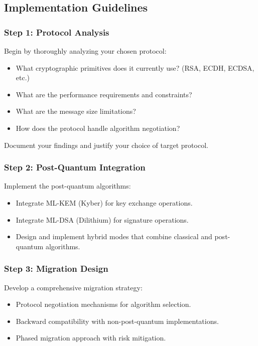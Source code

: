 \documentclass[10pt,a4paper,american]{article}
\begin{document}
\subsection*{Implementation Guidelines}

\subsubsection*{Step 1: Protocol Analysis}
Begin by thoroughly analyzing your chosen protocol:
\begin{itemize}
	\item What cryptographic primitives does it currently use? (RSA, ECDH, ECDSA, etc.)
	\item What are the performance requirements and constraints?
	\item What are the message size limitations?
	\item How does the protocol handle algorithm negotiation?
\end{itemize}

Document your findings and justify your choice of target protocol.

\subsubsection*{Step 2: Post-Quantum Integration}
Implement the post-quantum algorithms:
\begin{itemize}
	\item Integrate ML-KEM (Kyber) for key exchange operations.
	\item Integrate ML-DSA (Dilithium) for signature operations.
	\item Design and implement hybrid modes that combine classical and post-quantum algorithms.
\end{itemize}

\subsubsection*{Step 3: Migration Design}
Develop a comprehensive migration strategy:
\begin{itemize}
	\item Protocol negotiation mechanisms for algorithm selection.
	\item Backward compatibility with non-post-quantum implementations.
	\item Phased migration approach with risk mitigation.
\end{itemize}
\end{document}
